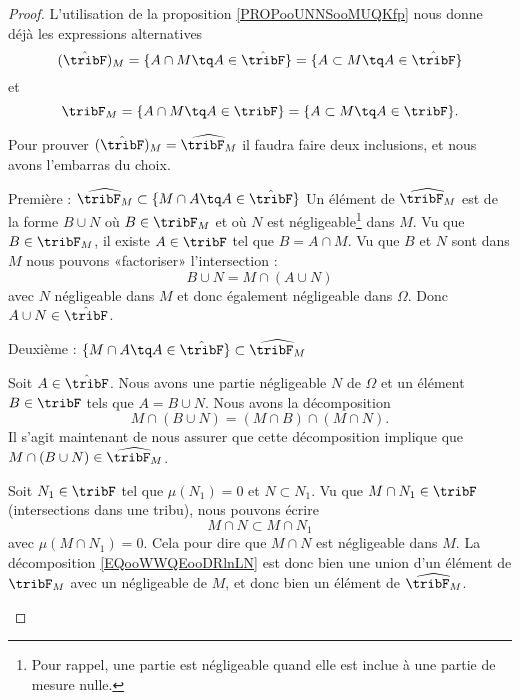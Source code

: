 \begin{proof}
    L'utilisation de la proposition \ref{PROPooUNNSooMUQKfp} nous donne déjà les expressions alternatives
    \begin{equation}
        (\hat\tribF)_M=\{ A\cap M\tq A\in\hat\tribF \}=\{ A\subset M\tq A\in\hat\tribF \}
    \end{equation}
    et
    \begin{equation}
        \tribF_M=\{ A\cap M\tq A\in\tribF \}=\{ A\subset M\tq A\in\tribF \}.
    \end{equation}

    Pour prouver \( (\hat\tribF)_M=\widehat{\tribF_M}\) il faudra faire deux inclusions, et nous avons l'embarras du choix.
    \begin{subproof}
    \item[Première : \( \widehat{\tribF_M}\subset\{ M\cap A\tq A\in\hat\tribF \}\)]
        Un élément de \( \widehat{\tribF_M}\) est de la forme \( B\cup N\) où \( B\in \tribF_M\) et où \( N\) est négligeable\footnote{Pour rappel, une partie est négligeable quand elle est inclue à une partie de mesure nulle.} dans \( M\). Vu que \( B\in\tribF_M\), il existe \( A\in\tribF\) tel que \( B=A\cap M\). Vu que \( B\) et \( N\) sont dans \( M\) nous pouvons «factoriser» l'intersection :
            \begin{equation}
                B\cup N=M\cap (A\cup N)
            \end{equation}
            avec \( N\) négligeable dans \( M\) et donc également négligeable dans \( \Omega\). Donc \( A\cup N\in \hat\tribF\).

        \item[Deuxième : \( \{ M\cap A\tq A\in\hat\tribF \}\subset \widehat{\tribF_M}\)]

            Soit \( A\in\hat\tribF\). Nous avons une partie négligeable \( N\) de \( \Omega\) et un élément \( B\in \tribF\) tels que \( A=B\cup N\). Nous avons la décomposition
            \begin{equation}        \label{EQooWWQEooDRlnLN}
                M\cap(B\cup N)=(M\cap B)\cap(M\cap N).
            \end{equation}
            Il s'agit maintenant de nous assurer que cette décomposition implique que \( M\cap(B\cup N)\in \widehat{\tribF_M}\).
            
            Soit \( N_1\in \tribF\) tel que \( \mu(N_1)=0\) et \( N\subset N_1\). Vu que \( M\cap N_1\in \tribF\) (intersections dans une tribu), nous pouvons écrire
            \begin{equation}
                M\cap N\subset M\cap N_1
            \end{equation}
            avec \( \mu(M\cap N_1)=0\). Cela pour dire que \( M\cap N\) est négligeable dans \( M\). La décomposition \eqref{EQooWWQEooDRlnLN} est donc bien une union d'un élément de \( \tribF_M\) avec un négligeable de \( M\), et donc bien un élément de \( \widehat{\tribF_M}\).
    \end{subproof}
\end{proof}

